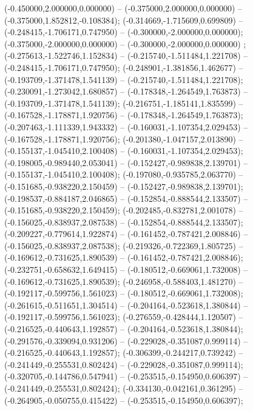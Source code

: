  (-0.450000,2.000000,0.000000) -- (-0.375000,2.000000,0.000000) -- (-0.375000,1.852812,-0.108384);
 (-0.314669,-1.715609,0.699809) -- (-0.248415,-1.706171,0.747950) -- (-0.300000,-2.000000,0.000000);
 (-0.375000,-2.000000,0.000000) -- (-0.300000,-2.000000,0.000000) ;
 (-0.275613,-1.522746,1.152834) -- (-0.215740,-1.511484,1.221708) -- (-0.248415,-1.706171,0.747950);
 (-0.248901,-1.381856,1.462677) -- (-0.193709,-1.371478,1.541139) -- (-0.215740,-1.511484,1.221708);
 (-0.230091,-1.273042,1.680857) -- (-0.178348,-1.264549,1.763873) -- (-0.193709,-1.371478,1.541139);
 (-0.216751,-1.185141,1.835599) -- (-0.167528,-1.178871,1.920756) -- (-0.178348,-1.264549,1.763873);
 (-0.207463,-1.111339,1.943332) -- (-0.160031,-1.107354,2.029453) -- (-0.167528,-1.178871,1.920756);
 (-0.201380,-1.047157,2.013890) -- (-0.155137,-1.045410,2.100408) -- (-0.160031,-1.107354,2.029453);
 (-0.198005,-0.989440,2.053041) -- (-0.152427,-0.989838,2.139701) -- (-0.155137,-1.045410,2.100408);
 (-0.197080,-0.935785,2.063770) -- (-0.151685,-0.938220,2.150459) -- (-0.152427,-0.989838,2.139701);
 (-0.198537,-0.884187,2.046865) -- (-0.152854,-0.888544,2.133507) -- (-0.151685,-0.938220,2.150459);
 (-0.202485,-0.832781,2.001078) -- (-0.156025,-0.838937,2.087538) -- (-0.152854,-0.888544,2.133507);
 (-0.209227,-0.779614,1.922874) -- (-0.161452,-0.787421,2.008846) -- (-0.156025,-0.838937,2.087538);
 (-0.219326,-0.722369,1.805725) -- (-0.169612,-0.731625,1.890539) -- (-0.161452,-0.787421,2.008846);
 (-0.232751,-0.658632,1.649415) -- (-0.180512,-0.669061,1.732008) -- (-0.169612,-0.731625,1.890539);
 (-0.246958,-0.588403,1.481270) -- (-0.192117,-0.599756,1.561023) -- (-0.180512,-0.669061,1.732008);
 (-0.261615,-0.511651,1.304514) -- (-0.204164,-0.523618,1.380844) -- (-0.192117,-0.599756,1.561023);
 (-0.276559,-0.428444,1.120507) -- (-0.216525,-0.440643,1.192857) -- (-0.204164,-0.523618,1.380844);
 (-0.291576,-0.339094,0.931206) -- (-0.229028,-0.351087,0.999114) -- (-0.216525,-0.440643,1.192857);
 (-0.306399,-0.244217,0.739242) -- (-0.241449,-0.255531,0.802424) -- (-0.229028,-0.351087,0.999114);
 (-0.320705,-0.144786,0.547941) -- (-0.253515,-0.154950,0.606397) -- (-0.241449,-0.255531,0.802424);
 (-0.334130,-0.042161,0.361295) -- (-0.264905,-0.050755,0.415422) -- (-0.253515,-0.154950,0.606397);
